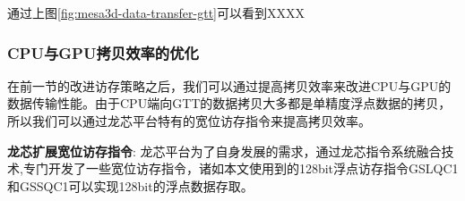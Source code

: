通过上图\ref{fig:mesa3d-data-transfer-gtt}可以看到XXXX

\subsubsection{CPU与GPU拷贝效率的优化}

在前一节的改进访存策略之后，我们可以通过提高拷贝效率来改进CPU与GPU的数据传输性能。由于CPU端向GTT的数据拷贝大多都是单精度浮点数据的拷贝，所以我们可以通过龙芯平台特有的宽位访存指令来提高拷贝效率。

\textbf{龙芯扩展宽位访存指令}: 龙芯平台为了自身发展的需求，通过龙芯指令系统融合技术\cite{loongson-merge},专门开发了一些宽位访存指令，诸如本文使用到的128bit浮点访存指令GSLQC1和GSSQC1可以实现128bit的浮点数据存取。



